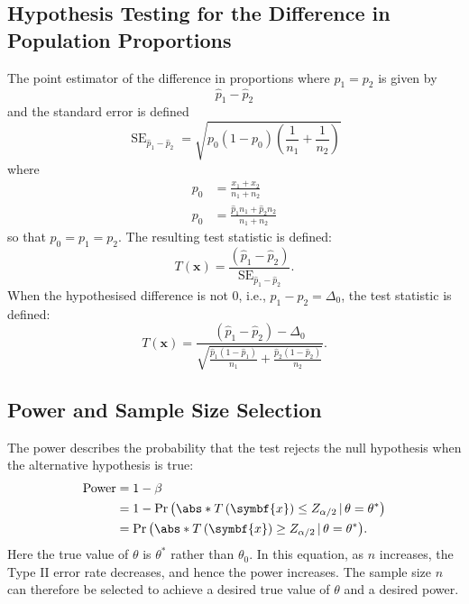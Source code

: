 \documentclass{article}
\begin{document}
\subsection{Hypothesis Testing for the Difference in Population Proportions}
The point estimator of the difference in proportions where \(p_1 =
p_2\) is given by
\begin{equation*}
    \hat{p}_1 - \hat{p}_2
\end{equation*}
and the standard error is defined
\begin{equation*}
    \operatorname{SE}_{\hat{p}_1 - \hat{p}_2} = \sqrt{p_0 \left( 1 - p_0 \right) \left( \frac{1}{n_1} + \frac{1}{n_2} \right)}
\end{equation*}
where
\begin{align*}
    p_0 & = \frac{x_1 + x_2}{n_1 + n_2}                     \\
    p_0 & = \frac{\hat{p}_1 n_1 + \hat{p}_2 n_2}{n_1 + n_2}
\end{align*}
so that \(p_0 = p_1 = p_2\).
The resulting test statistic is defined:
\begin{equation*}
    T\left( \symbf{x} \right) = \frac{\left( \hat{p}_1 - \hat{p}_2 \right)}{\operatorname{SE}_{\hat{p}_1 - \hat{p}_2}}.
\end{equation*}
When the hypothesised difference is not 0, i.e., \(p_1 - p_2 = \Delta_0\),
the test statistic is defined:
\begin{equation*}
    T\left( \symbf{x} \right) = \frac{\left( \hat{p}_1 - \hat{p}_2 \right) - \Delta_0}{\sqrt{\frac{\hat{p}_1 \left( 1 - \hat{p}_1 \right)}{n_1} + \frac{\hat{p}_2 \left( 1 - \hat{p}_2 \right)}{n_2}}}.
\end{equation*}
\subsection{Power and Sample Size Selection}
The power describes the probability that the test rejects the null
hypothesis when the alternative hypothesis is true:
\begin{align*}
    \operatorname{Power} & = 1 - \beta                                                                                                 \\
                         & = 1 - \Pr{\left( \abs*{T\left( \symbf{x} \right)} \leq Z_{\alpha/2} \,\vert\, \theta = \theta^\ast \right)} \\
                         & = \Pr{\left( \abs*{T\left( \symbf{x} \right)} \geq Z_{\alpha/2} \,\vert\, \theta = \theta^\ast \right)}.
\end{align*}
Here the true value of \(\theta\) is \(\theta^\ast\) rather than
\(\theta_0\). In this equation, as \(n\) increases, the Type II error
rate decreases, and hence the power increases. The sample size \(n\) can
therefore be selected to achieve a desired true value of \(\theta\) and
a desired power.
\end{document}
